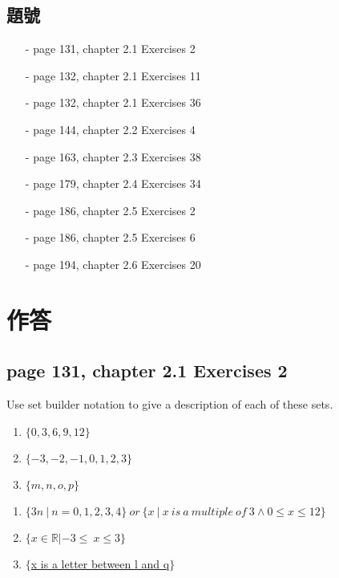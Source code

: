 \documentclass[sigconf]{acmart}
\begin{document}
\subsection{題號}
\begin{shaded}
\begin{itemize}
        \item[-] page 131, chapter 2.1 Exercises 2
	\item[-] page 132, chapter 2.1 Exercises 11
        \item[-] page 132, chapter 2.1 Exercises 36
	\item[-] page 144, chapter 2.2 Exercises 4
	\item[-] page 163, chapter 2.3 Exercises 38
	\item[-] page 179, chapter 2.4 Exercises 34
	\item[-] page 186, chapter 2.5 Exercises 2
 	\item[-] page 186, chapter 2.5 Exercises 6
  	\item[-] page 194, chapter 2.6 Exercises 20
\end{itemize}
\end{shaded}

\section{作答}
\subsection{page 131, chapter 2.1 Exercises 2}
\begin{shaded}
    Use set builder notation to give a description of each of these sets.
    \begin{enumerate}[label=(\alph*)]
    	\item $\{0, 3, 6, 9, 12\}$
    	\item $\{-3,-2,-1, 0, 1, 2, 3\}$
            \item $\{m, n, o, p\}$
    \end{enumerate}
\end{shaded}  
\begin{enumerate}[label=(\alph*)]
	\item $\{3n\ |\ n = 0, 1, 2, 3, 4\}\ or\ \{x\ |\ x\ is\ a\ multiple\ of\ 3\wedge 0\le x\le 12\}$
	\item \underline{$\{x\in \mathbb{R}|-3\leq\ x \leq 3\}$}
    \item \underline{$\{$x is a letter between l and q$\}$}
\end{enumerate}
\end{document}
